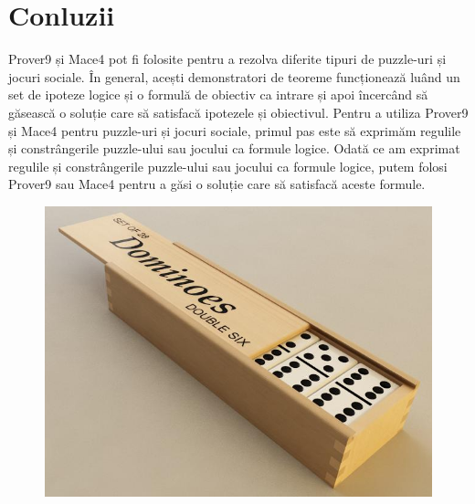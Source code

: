 \section{Conluzii}
Prover9 și Mace4 pot fi folosite pentru a rezolva diferite tipuri de puzzle-uri și jocuri sociale. În general, acești demonstratori de teoreme funcționează luând un set de ipoteze logice și o formulă de obiectiv ca intrare și apoi încercând să găsească o soluție care să satisfacă ipotezele și obiectivul.\newline\newline
Pentru a utiliza Prover9 și Mace4 pentru puzzle-uri și jocuri sociale, primul pas este să exprimăm regulile și constrângerile puzzle-ului sau jocului ca formule logice.\newline\newline
Odată ce am exprimat regulile și constrângerile puzzle-ului sau jocului ca formule logice, putem folosi Prover9 sau Mace4 pentru a găsi o soluție care să satisfacă aceste formule.
\newline\newline

\begin{figure}[h]
    \centering
    \includegraphics[width5cm]{text/images/pic10.jpg}\\

\end{figure}

